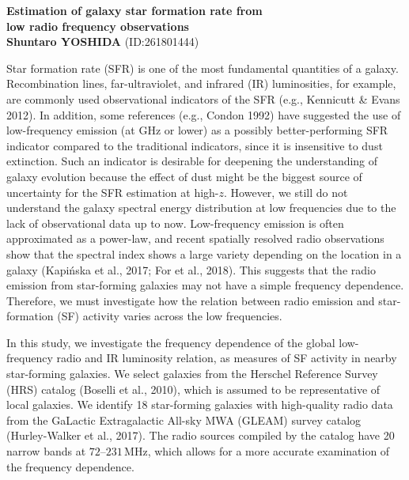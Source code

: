 \documentclass[12pt,a4paper,twoside,openright,titlepage,draft]{report}
\begin{document}
\begin{center}
{\Large \textbf{Estimation of galaxy star formation rate from \\ low radio frequency observations}}\\
\vspace{0.2cm}
{\large \textbf{Shuntaro YOSHIDA} (ID:\@261801444)}\\
\end{center}

Star formation rate (SFR) is one of the most fundamental quantities of a galaxy.
Recombination lines, far-ultraviolet, and infrared (IR) luminosities, for example, are commonly used observational indicators of the SFR (e.g., Kennicutt \& Evans 2012).
In addition, some references (e.g., Condon 1992) have suggested the use of low-frequency emission (at GHz or lower) as a possibly better-performing SFR indicator compared to the traditional indicators, since it is insensitive to dust extinction.
Such an indicator is desirable for deepening the understanding of galaxy evolution because the effect of dust might be the biggest source of uncertainty for the SFR estimation at high-$z$.
However, we still do not understand the galaxy spectral energy distribution at low frequencies due to the lack of observational data up to now.
Low-frequency emission is often approximated as a power-law, and recent spatially resolved radio observations show that the spectral index shows a large variety depending on the location in a galaxy (Kapi\'{n}ska et al., 2017; For et al., 2018).
This suggests that the radio emission from star-forming galaxies may not have a simple frequency dependence.
Therefore, we must investigate how the relation between radio emission and star-formation (SF) activity varies across the low frequencies.

In this study, we investigate the frequency dependence of the global low-frequency radio and IR luminosity relation, as measures of SF activity in nearby star-forming galaxies.
We select galaxies from the Herschel Reference Survey (HRS) catalog (Boselli et al., 2010), which is assumed to be representative of local galaxies.
We identify 18 star-forming galaxies with high-quality radio data from the GaLactic Extragalactic All-sky MWA (GLEAM) survey catalog (Hurley-Walker et al., 2017).
The radio sources compiled by the catalog have 20 narrow bands at $72\mbox{--}231\,\mathrm{MHz}$, which allows for a more accurate examination of the frequency dependence.
\end{document}

